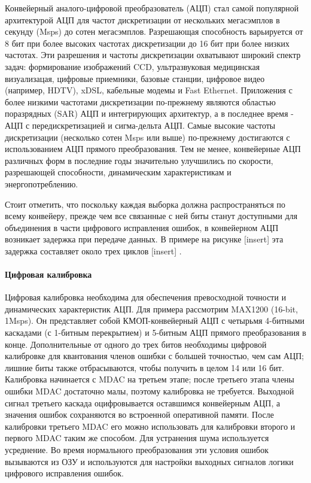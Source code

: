 \documentclass[a4paper,12pt]{article} %
\begin{document}
Конвейерный аналого-цифровой преобразователь (АЦП) стал самой популярной архитектурой АЦП для частот дискретизации от нескольких мегасэмплов в секунду (Msps) до сотен мегасэмплов. Разрешающая способность варьируется от 8 бит при более высоких частотах дискретизации до 16 бит при более низких частотах. Эти разрешения и частоты дискретизации охватывают широкий спектр задач: формирование изображений CCD, ультразвуковая медицинская визуализацая, цифровые приемники, базовые станции, цифровое видео (например, HDTV), xDSL, кабельные модемы и Fast Ethernet. Приложения с более низкими частотами дискретизации по-прежнему являются областью поразрядных (SAR)  АЦП и интегрирующих архитектур, а в последнее время - АЦП с передискретизацией и сигма-дельта АЦП. Самые высокие частоты дискретизации (несколько сотен Msps или выше) по-прежнему достигаются с использованием АЦП прямого преобразования. Тем не менее, конвейерные АЦП различных форм в последние годы значительно улучшились по скорости, разрешающей способности, динамическим характеристикам и энергопотреблению.






Стоит отметить, что поскольку каждая выборка должна распространяться по всему конвейеру, прежде чем все связанные с ней биты станут доступными для объединения в части цифрового исправления ошибок, в конвейерном АЦП возникает задержка при передаче данных. В примере на рисунке [insert] эта задержка составляет около трех циклов [insert] . 


\paragraph{Цифровая калибровка}
Цифровая калибровка необходима для обеспечения превосходной точности и динамических характеристик АЦП. Для примера рассмотрим MAX1200 (16-bit, 1Msps). Он представляет собой КМОП-конвейерный АЦП с четырьмя 4-битными каскадами (с 1-битным перекрытием) и 5-битным АЦП прямого преобразования в конце. Дополнительные от одного до трех битов необходимы цифровой калибровке для квантования членов ошибки с большей точностью, чем сам АЦП; лишние биты также отбрасываются, чтобы получить в целом 14 или 16 бит. Калибровка начинается с MDAC на третьем этапе; после третьего этапа члены ошибки MDAC достаточно малы, поэтому калибровка не требуется. Выходной сигнал третьего каскада оцифровывается оставшимся конвейерным АЦП, а значения ошибок сохраняются во встроенной оперативной памяти. После калибровки третьего MDAC его можно использовать для калибровки второго и первого MDAC таким же способом. Для устранения шума используется усреднение. Во время нормального преобразования эти условия ошибок вызываются из ОЗУ и используются для настройки выходных сигналов логики цифрового исправления ошибок. 
\end{document}
